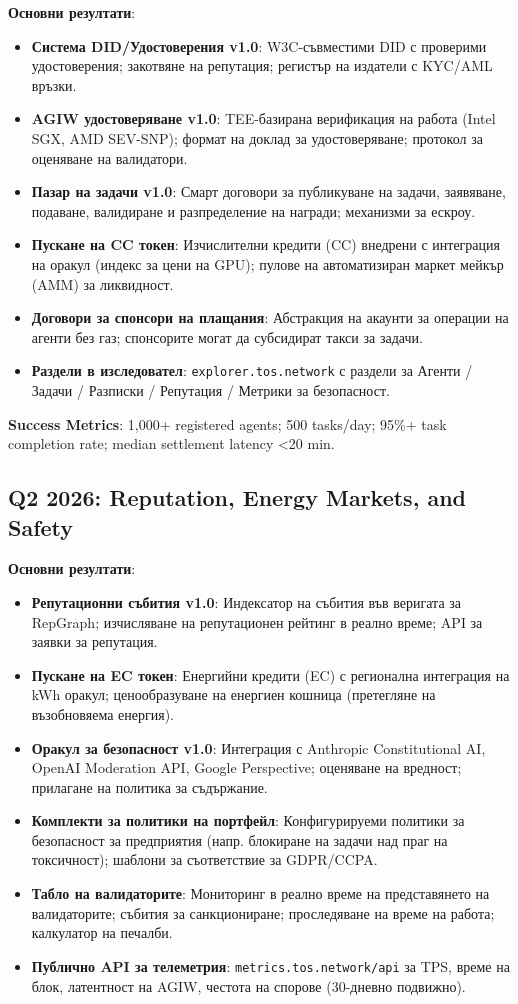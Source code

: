 \documentclass[11pt]{article}
\begin{document}
\textbf{Основни резултати}:
\begin{itemize}[noitemsep]
  \item \textbf{Система DID/Удостоверения v1.0}: W3C-съвместими DID с проверими удостоверения; закотвяне на репутация; регистър на издатели с KYC/AML връзки.
  \item \textbf{AGIW удостоверяване v1.0}: TEE-базирана верификация на работа (Intel SGX, AMD SEV-SNP); формат на доклад за удостоверяване; протокол за оценяване на валидатори.
  \item \textbf{Пазар на задачи v1.0}: Смарт договори за публикуване на задачи, заявяване, подаване, валидиране и разпределение на награди; механизми за ескроу.
  \item \textbf{Пускане на CC токен}: Изчислителни кредити (CC) внедрени с интеграция на оракул (индекс за цени на GPU); пулове на автоматизиран маркет мейкър (AMM) за ликвидност.
  \item \textbf{Договори за спонсори на плащания}: Абстракция на акаунти за операции на агенти без газ; спонсорите могат да субсидират такси за задачи.
  \item \textbf{Раздели в изследовател}: \texttt{explorer.tos.network} с раздели за Агенти / Задачи / Разписки / Репутация / Метрики за безопасност.
\end{itemize}

\textbf{Success Metrics}: 1,000+ registered agents; 500 tasks/day; 95\%+ task completion rate; median settlement latency <20 min.

\subsection{Q2 2026: Reputation, Energy Markets, and Safety}

\textbf{Основни резултати}:
\begin{itemize}[noitemsep]
  \item \textbf{Репутационни събития v1.0}: Индексатор на събития във веригата за RepGraph; изчисляване на репутационен рейтинг в реално време; API за заявки за репутация.
  \item \textbf{Пускане на EC токен}: Енергийни кредити (EC) с регионална интеграция на kWh оракул; ценообразуване на енергиен кошница (претегляне на възобновяема енергия).
  \item \textbf{Оракул за безопасност v1.0}: Интеграция с Anthropic Constitutional AI, OpenAI Moderation API, Google Perspective; оценяване на вредност; прилагане на политика за съдържание.
  \item \textbf{Комплекти за политики на портфейл}: Конфигурируеми политики за безопасност за предприятия (напр. блокиране на задачи над праг на токсичност); шаблони за съответствие за GDPR/CCPA.
  \item \textbf{Табло на валидаторите}: Мониторинг в реално време на представянето на валидаторите; събития за санкциониране; проследяване на време на работа; калкулатор на печалби.
  \item \textbf{Публично API за телеметрия}: \texttt{metrics.tos.network/api} за TPS, време на блок, латентност на AGIW, честота на спорове (30-дневно подвижно).
\end{itemize}
\end{document}
